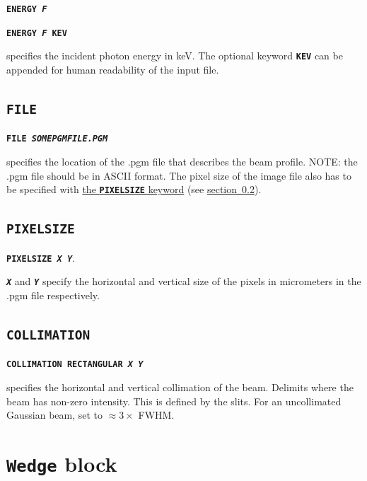 \documentclass[a4paper]{article}
\newcommand{\Class}[1]{\texttt{#1}\xspace}
\newcommand{\Keyword}[1]{\texttt{\textbf{#1}}\xspace}
\newcommand{\SB}{\\[0.2em]}
\begin{document}
\noindent \Keyword{ENERGY \textit{F}}

\noindent \Keyword{ENERGY \textit{F} KEV}

specifies the incident photon energy in keV. The optional keyword \Keyword{KEV} can be appended for human readability of the input file.

\subsection{\Keyword{FILE}}
\label{file}

\noindent \Keyword{FILE \textit{SOMEPGMFILE.PGM}}

specifies the location of the .pgm file that describes the beam profile. NOTE: the .pgm file should be in ASCII format. The pixel size of the image file also has to be specified with \hyperref[pixelsize]{the \Keyword{PIXELSIZE} keyword} (see \hyperref[pixelsize]{section~\ref*{pixelsize}}).\SB

\subsection{\Keyword{PIXELSIZE}}
\label{pixelsize}

\noindent \Keyword{PIXELSIZE \textit{X Y}}.

\Keyword{\textit{X}} and \Keyword{\textit{Y}} specify the horizontal and vertical size of the pixels in micrometers in the .pgm file respectively.

\subsection{\Keyword{COLLIMATION}}

\noindent \Keyword{COLLIMATION RECTANGULAR \textit{X Y}}

specifies the horizontal and vertical collimation of the beam.
Delimits where the beam has non-zero intensity.
This is defined by the slits.
For an uncollimated Gaussian beam, set to $\approx 3 \times$ FWHM.

%
%

\section{\Class{Wedge} block}
\end{document}
